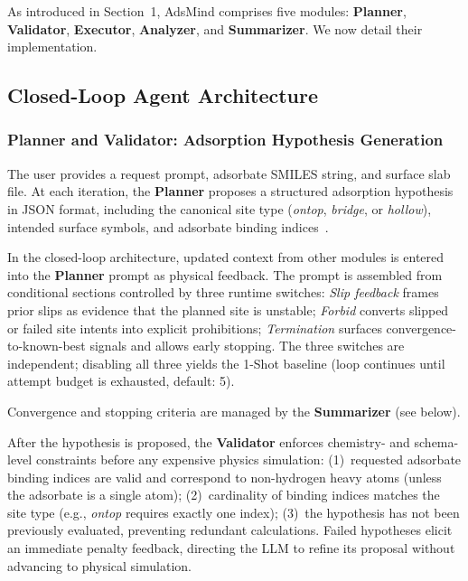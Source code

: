 As introduced in Section~1, AdsMind comprises five modules: \textbf{Planner}, \textbf{Validator}, \textbf{Executor}, \textbf{Analyzer}, and \textbf{Summarizer}.
We now detail their implementation.

\subsection{Closed-Loop Agent Architecture}

\subsubsection{Planner and Validator: Adsorption Hypothesis Generation}

The user provides a request prompt, adsorbate SMILES string, and surface slab file.
At each iteration, the \textbf{Planner} proposes a structured adsorption hypothesis in JSON format, including the canonical site type (\textit{ontop}, \textit{bridge}, or \textit{hollow}), intended surface symbols, and adsorbate binding indices~\cite{norskov2004density,shriver2006inorganic}.

In the closed-loop architecture, updated context from other modules is entered into the \textbf{Planner} prompt as physical feedback.
The prompt is assembled from conditional sections controlled by three runtime switches:
\textit{Slip feedback} frames prior slips as evidence that the planned site is unstable;
\textit{Forbid} converts slipped or failed site intents into explicit prohibitions;
\textit{Termination} surfaces convergence-to-known-best signals and allows early stopping.
The three switches are independent; disabling all three yields the 1-Shot baseline (loop continues until attempt budget is exhausted, default: 5).

Convergence and stopping criteria are managed by the \textbf{Summarizer} (see below).

After the hypothesis is proposed, the \textbf{Validator} enforces chemistry- and schema-level constraints before any expensive physics simulation:
(1)~requested adsorbate binding indices are valid and correspond to non-hydrogen heavy atoms (unless the adsorbate is a single atom);
(2)~cardinality of binding indices matches the site type (e.g., \textit{ontop} requires exactly one index);
(3)~the hypothesis has not been previously evaluated, preventing redundant calculations.
Failed hypotheses elicit an immediate penalty feedback, directing the LLM to refine its proposal without advancing to physical simulation.

